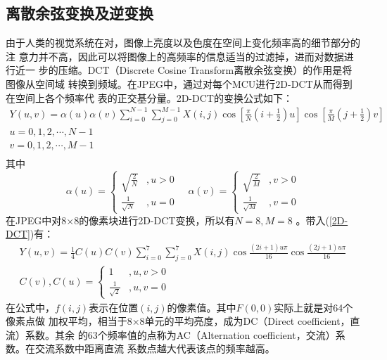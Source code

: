 \documentclass{article}
\numberwithin {equation}{section}
\begin{document}
\begin{spacing}{1.25}
  \subsection{离散余弦变换及逆变换}
    \vspace{1em}
    由于人类的视觉系统在对，图像上亮度以及色度在空间上变化频率高的细节部分的注
    意力并不高，因此可以将图像上的高频率的信息适当的过滤掉，进而对数据进行近一
    步的压缩。DCT（Discrete Cosine Transform离散余弦变换）的作用是将图像从空间域
    转换到频域。在JPEG中，通过对每个MCU进行2D-DCT从而得到在空间上各个频率代
    表的正交基分量。2D-DCT的变换公式如下：
    \begin{equation}
      \begin{gathered}
        Y(u,v)=\alpha (u)\alpha (v) \sum_{i=0}^{N-1} \sum_{j=0}^{M-1}
        X(i,j)\cos \left[ \frac{\pi}{N}\left(i+\frac{1}{2}\right)u \right]
        \cos \left[ \frac{\pi}{M}\left(j+\frac{1}{2}\right)v \right]\\
        u=0,1,2,\cdots ,N-1 \\
        v=0,1,2,\cdots,M-1 \\
      \end{gathered}
      \label{2D-DCT}
    \end{equation}
    其中
    \begin{equation}
      \alpha (u) = \begin{cases}
        \sqrt{\frac{2}{N}} &,u>0\\
        \frac{1}{\sqrt{N}} &,u=0
      \end{cases}\quad
      \alpha (v) = \begin{cases}
        \sqrt{\frac{2}{M}} &,v>0\\
        \frac{1}{\sqrt{M}} &,v=0
      \end{cases}
    \end{equation}
    在JPEG中对8×8的像素块进行2D-DCT变换，所以有$N=8,M=8$ 。带入(\ref{2D-DCT})有：
    \begin{equation}
      \begin{gathered}
        Y(u,v)=\frac{1}{4}C(u)C(v) \sum_{i=0}^{7} \sum_{j=0}^{7}
        X(i,j)\cos \frac{(2i+1)u\pi}{16}\cos \frac{(2j+1)u\pi}{16}\\
        C (v),C (u) = \begin{cases}
          1 &,u,v>0\\
          \frac{1}{\sqrt{2}} &,u,v=0
        \end{cases}
      \end{gathered}
      \label{8*8 2D-DCT}
    \end{equation}
    在公式中，$f(i,j)$表示在位置$(i,j)$的像素值。其中$F(0,0)$实际上就是对64个像素点做
    加权平均，相当于8×8单元的平均亮度，成为DC（Direct coefficient，直流）系数。其余
    的63个频率值的点称为AC（Alternation coefficient，交流）系数。在交流系数中距离直流
    系数点越大代表该点的频率越高。


\end{spacing}
\end{document}
